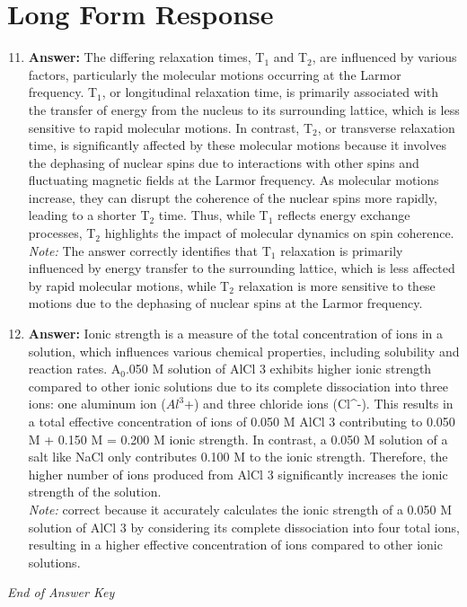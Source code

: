 \documentclass[12pt]{article}
\begin{document}
\section*{Long Form Response}
\begin{enumerate}[label=\arabic*.]
\setcounter{enumi}{10}
\item \textbf{Answer:} The differing relaxation times, T$_{1}$ and T$_{2}$, are influenced by various factors, particularly the molecular motions occurring at the Larmor frequency. T$_{1}$, or longitudinal relaxation time, is primarily associated with the transfer of energy from the nucleus to its surrounding lattice, which is less sensitive to rapid molecular motions. In contrast, T$_{2}$, or transverse relaxation time, is significantly affected by these molecular motions because it involves the dephasing of nuclear spins due to interactions with other spins and fluctuating magnetic fields at the Larmor frequency. As molecular motions increase, they can disrupt the coherence of the nuclear spins more rapidly, leading to a shorter T$_{2}$ time. Thus, while T$_{1}$ reflects energy exchange processes, T$_{2}$ highlights the impact of molecular dynamics on spin coherence.
\\ \textit{Note:} The answer correctly identifies that T$_{1}$ relaxation is primarily influenced by energy transfer to the surrounding lattice, which is less affected by rapid molecular motions, while T$_{2}$ relaxation is more sensitive to these motions due to the dephasing of nuclear spins at the Larmor frequency.
\item \textbf{Answer:} Ionic strength is a measure of the total concentration of ions in a solution, which influences various chemical properties, including solubility and reaction rates. A$_{0}$.050 M solution of AlCl 3 exhibits higher ionic strength compared to other ionic solutions due to its complete dissociation into three ions: one aluminum ion ($Al^3$+) and three chloride ions (Cl^-). This results in a total effective concentration of ions of 0.050 M AlCl 3 contributing to 0.050 M + 0.150 M = 0.200 M ionic strength. In contrast, a 0.050 M solution of a salt like NaCl only contributes 0.100 M to the ionic strength. Therefore, the higher number of ions produced from AlCl 3 significantly increases the ionic strength of the solution.
\\ \textit{Note:} correct because it accurately calculates the ionic strength of a 0.050 M solution of AlCl 3 by considering its complete dissociation into four total ions, resulting in a higher effective concentration of ions compared to other ionic solutions.
\end{enumerate}

\vfill
\noindent\textit{End of Answer Key}
\end{document}
